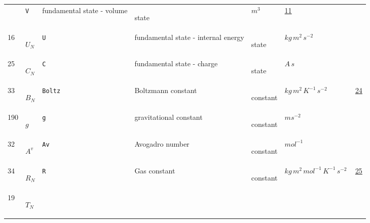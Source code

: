 \begin{longtable}{|p{1cm}|p{2.5cm}|p{4.5cm}|p{8cm}|p{3.0cm}|p{3cm}|p{1cm}|}
             & \verb|V|
             & fundamental state - volume
             & \begin{lay}state \end{lay}
             & $ m^{3} \, $
             &                 \hyperlink{"e:11"}{ 11 }
                 \\
            16
             & \hypertarget{"v:16"}{ $ {U}{_{N}} $}
             & \verb|U|
             & fundamental state - internal energy
             & \begin{lay}state \end{lay}
             & $ kg \,m^{2} \,s^{-2} \, $
             & \\
            25
             & \hypertarget{"v:25"}{ $ {C}{_{N}} $}
             & \verb|C|
             & fundamental state - charge
             & \begin{lay}state \end{lay}
             & $ A \,s \, $
             & \\
            33
             & \hypertarget{"v:33"}{ $ {B}{_{N}} $}
             & \verb|Boltz|
             & Boltzmann constant
             & \begin{lay}constant \end{lay}
             & $ kg \,m^{2} \,K^{-1} \,s^{-2} \, $
             &                 \hyperlink{"e:24"}{ 24 }
                 \\
            190
             & \hypertarget{"v:190"}{ $ {g}{_{}} $}
             & \verb|g|
             & gravitational constant
             & \begin{lay}constant \end{lay}
             & $ m s^{-2} \, $
             & \\
            32
             & \hypertarget{"v:32"}{ $ {{A^v}}{_{}} $}
             & \verb|Av|
             & Avogadro number
             & \begin{lay}constant \end{lay}
             & $ mol^{-1} \, $
             & \\
            34
             & \hypertarget{"v:34"}{ $ {R}{_{N}} $}
             & \verb|R|
             & Gas constant
             & \begin{lay}constant \end{lay}
             & $ kg \,m^{2} \,mol^{-1} \,K^{-1} \,s^{-2} \, $
             &                 \hyperlink{"e:25"}{ 25 }
                 \\
            19
             & \hypertarget{"v:19"}{ $ {T}{_{N}} $}

\end{longtable}
